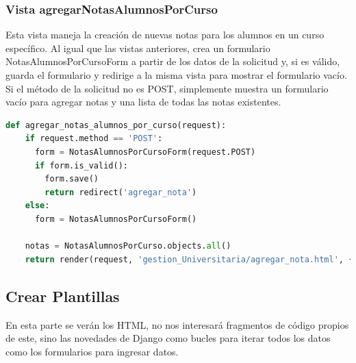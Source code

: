 \documentclass{article}
\begin{document}
  \subsubsection{Vista agregarNotasAlumnosPorCurso}
  Esta vista maneja la creación de nuevas notas para los alumnos en un curso específico. Al igual que las vistas anteriores, 
  crea un formulario NotasAlumnosPorCursoForm a partir de los datos de la solicitud y, si es válido, guarda el formulario y 
  redirige a la misma vista para mostrar el formulario vacío. Si el método de la solicitud no es POST, simplemente muestra un 
  formulario vacío para agregar notas y una lista de todas las notas existentes.
  \begin{lstlisting}[language=python, caption={Vista agregarNotasAlumnosPorCurso}]
  def agregar_notas_alumnos_por_curso(request):
    if request.method == 'POST':
      form = NotasAlumnosPorCursoForm(request.POST)
      if form.is_valid():
        form.save()
        return redirect('agregar_nota')
    else:
      form = NotasAlumnosPorCursoForm()
      
    notas = NotasAlumnosPorCurso.objects.all()
    return render(request, 'gestion_Universitaria/agregar_nota.html', {'form': form, 'notas': notas})
  \end{lstlisting}
  

  \subsection{Crear Plantillas}
  En esta parte se verán los HTML, no nos interesará fragmentos de código propios de este, sino las novedades de Django como bucles para 
  iterar todos los datos como los formularios para ingresar datos.
  
\end{document}
